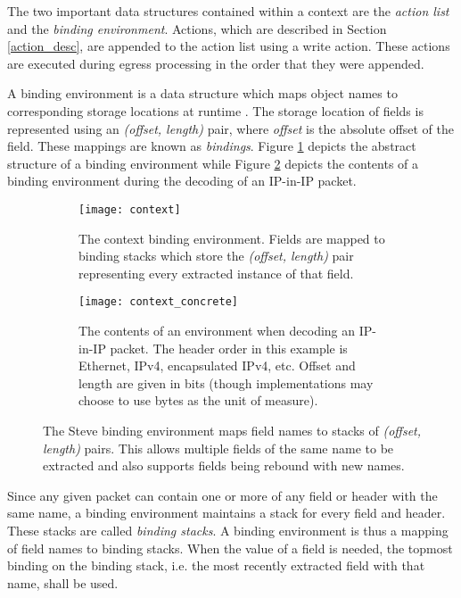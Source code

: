 The two important data structures contained within a context are 
the \emph{action list} and the \emph{binding environment}.
Actions, which are described in Section \ref{action_desc}, are appended
to the action list using a write action.
These actions are executed during egress processing in the 
order that they were appended.

A binding environment is a data structure which maps object names to
corresponding storage locations at runtime \cite{compilers1}.
The storage location of fields is represented using an \emph{(offset, length)} pair, where \textit{offset} is the absolute offset of the field.
These mappings are known as \emph{bindings}. Figure \ref{fg:context1} 
depicts the abstract structure of a binding environment while Figure \ref{fg:context2}
depicts the contents of a binding environment during the decoding of an IP-in-IP packet.

\begin{figure}[ht]
\begin{subfigure}[t]{.45\textwidth}
  \centering
  \texttt{[image: context]}
  \caption{The context binding environment. Fields are mapped to binding stacks which store the \emph{(offset, length)} pair representing every extracted instance of that field.}
  \label{fg:context1}
\end{subfigure}
\hfill
\begin{subfigure}[t]{.45\textwidth}
  \centering
  \texttt{[image: context\_concrete]}
  \caption{The contents of an environment when decoding an IP-in-IP packet. The header order in this example is Ethernet, IPv4, encapsulated IPv4, etc. Offset and length are given in bits (though implementations
  may choose to use bytes as the unit of measure).}
  \label{fg:context2}
\end{subfigure}


\caption{The Steve binding environment maps field names to stacks of
  \emph{(offset, length)} pairs. This allows multiple fields of the same
  name to be extracted and also supports fields being rebound with new names.}
\label{fg:ContextEnv}
\end{figure}

Since any given packet can contain one or more of any field or header with the
same name, a binding environment maintains a stack for every field and header.
These stacks are called \emph{binding stacks}. A binding environment is thus a 
mapping of field names to binding stacks. 
When the value of a field is needed, 
the topmost binding on the binding stack, i.e. the
most recently extracted field with that name, shall be used.

